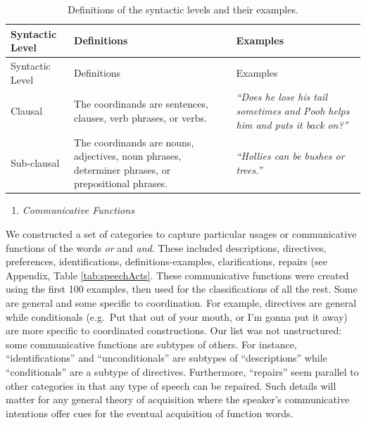 \documentclass[
  english,
  ,man,floatsintext]{apa6}
\providecommand{\tightlist}{%
  \setlength{\itemsep}{0pt}\setlength{\parskip}{0pt}}
\begin{document}
\begin{longtable}[]{@{}
  >{\raggedright\arraybackslash}p{}
  >{\raggedright\arraybackslash}p{}
  >{\raggedright\arraybackslash}p{}@{}}
\caption{\label{tab:syntacticLevel} Definitions of the syntactic levels and their examples.}\tabularnewline
\toprule
Syntactic Level & Definitions & Examples \\
\midrule
\endfirsthead
\toprule
Syntactic Level & Definitions & Examples \\
\midrule
\endhead
Clausal & The coordinands are sentences, clauses, verb phrases, or verbs. & \emph{``Does he lose his tail sometimes and Pooh helps him and puts it back on?''} \\
Sub-clausal & The coordinands are nouns, adjectives, noun phrases, determiner phrases, or prepositional phrases. & \emph{``Hollies can be bushes or trees.''} \\
\bottomrule
\end{longtable}

\begin{enumerate}
\def\labelenumi{\arabic{enumi}.}
\setcounter{enumi}{5}
\tightlist
\item
  \emph{Communicative Functions}
\end{enumerate}

We constructed a set of categories to capture particular usages or communicative functions of the words \emph{or} and \emph{and}. These included descriptions, directives, preferences, identifications, definitions-examples, clarifications, repairs (see Appendix, Table \ref{tab:speechActs}. These communicative functions were created using the first 100 examples, then used for the classifications of all the rest. Some are general and some specific to coordination. For example, directives are general while conditionals (e.g.~Put that out of your mouth, or I'm gonna put it away) are more specific to coordinated constructions. Our list was not unstructured: some communicative functions are subtypes of others. For instance, ``identifications'' and ``unconditionals'' are subtypes of ``descriptions'' while ``conditionals'' are a subtype of directives. Furthermore, ``repairs'' seem parallel to other categories in that any type of speech can be repaired. Such details will matter for any general theory of acquisition where the speaker's communicative intentions offer cues for the eventual acquisition of function words.
\end{document}
